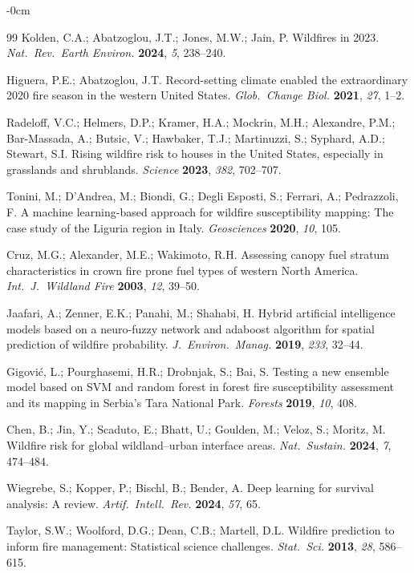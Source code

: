 \documentclass[fire,article,submit,pdftex]{../Definitions/mdpi}
\begin{document}
\begin{adjustwidth}{-\extralength}{0cm}
\begin{thebibliography}{99}
Kolden, C.A.; Abatzoglou, J.T.; Jones, M.W.; Jain, P.
Wildfires in 2023.
\textit{Nat.\ Rev.\ Earth Environ.} \textbf{2024}, \textit{5}, 238--240.

Higuera, P.E.; Abatzoglou, J.T.
Record-setting climate enabled the extraordinary 2020 fire season in the western United States.
\textit{Glob.\ Change Biol.} \textbf{2021}, \textit{27}, 1--2.

Radeloff, V.C.; Helmers, D.P.; Kramer, H.A.; Mockrin, M.H.; Alexandre, P.M.; Bar-Massada, A.; Butsic, V.; Hawbaker, T.J.; Martinuzzi, S.; Syphard, A.D.; Stewart, S.I.
Rising wildfire risk to houses in the United States, especially in grasslands and shrublands.
\textit{Science} \textbf{2023}, \textit{382}, 702--707.

Tonini, M.; D'Andrea, M.; Biondi, G.; Degli Esposti, S.; Ferrari, A.; Pedrazzoli, F.
A machine learning-based approach for wildfire susceptibility mapping: The case study of the Liguria region in Italy.
\textit{Geosciences} \textbf{2020}, \textit{10}, 105.

Cruz, M.G.; Alexander, M.E.; Wakimoto, R.H.
Assessing canopy fuel stratum characteristics in crown fire prone fuel types of western North America.
\textit{Int.\ J.\ Wildland Fire} \textbf{2003}, \textit{12}, 39--50.

Jaafari, A.; Zenner, E.K.; Panahi, M.; Shahabi, H.
Hybrid artificial intelligence models based on a neuro-fuzzy network and adaboost algorithm for spatial prediction of wildfire probability.
\textit{J.\ Environ.\ Manag.} \textbf{2019}, \textit{233}, 32--44.

Gigovi\'{c}, L.; Pourghasemi, H.R.; Drobnjak, S.; Bai, S.
Testing a new ensemble model based on SVM and random forest in forest fire susceptibility assessment and its mapping in Serbia's Tara National Park.
\textit{Forests} \textbf{2019}, \textit{10}, 408.

Chen, B.; Jin, Y.; Scaduto, E.; Bhatt, U.; Goulden, M.; Veloz, S.; Moritz, M.
Wildfire risk for global wildland--urban interface areas.
\textit{Nat.\ Sustain.} \textbf{2024}, \textit{7}, 474--484.

Wiegrebe, S.; Kopper, P.; Bischl, B.; Bender, A.
Deep learning for survival analysis: A review.
\textit{Artif.\ Intell.\ Rev.} \textbf{2024}, \textit{57}, 65.

Taylor, S.W.; Woolford, D.G.; Dean, C.B.; Martell, D.L.
Wildfire prediction to inform fire management: Statistical science challenges.
\textit{Stat.\ Sci.} \textbf{2013}, \textit{28}, 586--615.


\end{thebibliography}
\end{adjustwidth}
\end{document}

